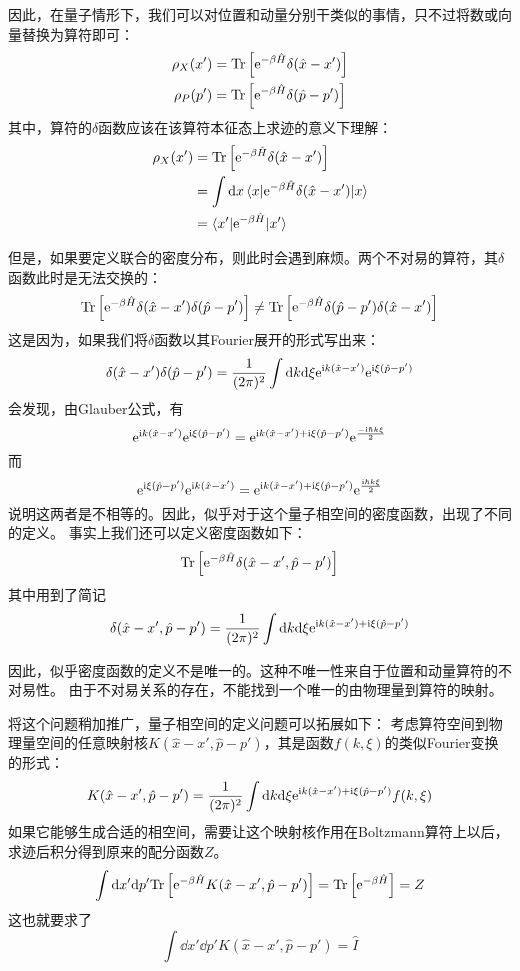         因此，在量子情形下，我们可以对位置和动量分别干类似的事情，只不过将数或向量替换为算符即可：
        \[
            \begin{gathered}
                \rho_X(x') = \textrm{Tr}\left[\mathrm{e}^{-\beta\hat{H}}\delta(\hat{x} - x')\right]
                \\
                \rho_P(p') = \textrm{Tr}\left[\mathrm{e}^{-\beta\hat{H}}\delta(\hat{p} - p')\right]
            \end{gathered}
        \]
        其中，算符的\(\delta\)函数应该在该算符本征态上求迹的意义下理解：
        \[
            \begin{aligned}
                \rho_X(x') &= \textrm{Tr}\left[\mathrm{e}^{-\beta\hat{H}}\delta(\hat{x} - x')\right] 
            \\ &= \int \mathrm{d} x \braket{x | \mathrm{e}^{-\beta\hat{H}}\delta(\hat{x} - x') | x}
            \\ &= \braket{x' | \mathrm{e}^{-\beta\hat{H}} | x'}
            \end{aligned}
        \]

        但是，如果要定义联合的密度分布，则此时会遇到麻烦。两个不对易的算符，其\(\delta\)函数此时是无法交换的：
        \[
            \textrm{Tr}\left[\mathrm{e}^{-\beta\hat{H}}\delta(\hat{x} - x')\delta(\hat{p} - p')\right] \neq \textrm{Tr}\left[\mathrm{e}^{-\beta\hat{H}}\delta(\hat{p} - p')\delta(\hat{x} - x')\right]
        \]
        这是因为，如果我们将\(\delta\)函数以其Fourier展开的形式写出来：
        \[
            \delta(\hat{x} - x')\delta(\hat{p} - p') = \frac{1}{(2\pi)^2} \int \mathrm{d} k \mathrm{d} \xi \mathrm{e}^{\mathrm{i} k(\hat{x} - x')}\mathrm{e}^{\mathrm{i} \xi (\hat{p} - p')}
        \]
        会发现，由Glauber公式，有
        \[
            \mathrm{e}^{\mathrm{i} k(\hat{x} - x')}\mathrm{e}^{\mathrm{i} \xi (\hat{p} - p')} = \mathrm{e}^{\mathrm{i} k(\hat{x} - x') + \mathrm{i} \xi (\hat{p} - p')} \mathrm{e}^{\frac{-\mathrm{i}\hbar k\xi}{2}}
        \]
        而
        \[
            \mathrm{e}^{\mathrm{i} \xi (\hat{p} - p')}\mathrm{e}^{\mathrm{i} k(\hat{x} - x')} = \mathrm{e}^{\mathrm{i} k(\hat{x} - x') + \mathrm{i} \xi (\hat{p} - p')} \mathrm{e}^{\frac{\mathrm{i}\hbar k\xi}{2}}
        \]
        说明这两者是不相等的。因此，似乎对于这个量子相空间的密度函数，出现了不同的定义。
        事实上我们还可以定义密度函数如下：
        \[
            \textrm{Tr}\left[\mathrm{e}^{-\beta\hat{H}}\delta(\hat{x} - x', \hat{p} - p')\right]
        \]
        其中用到了简记
        \[
            \delta(\hat{x} - x', \hat{p} - p') = \frac{1}{(2\pi)^2} \int \mathrm{d} k \mathrm{d} \xi
            \mathrm{e}^{\mathrm{i} k(\hat{x} - x') + \mathrm{i} \xi (\hat{p} - p')}
        \]

        因此，似乎密度函数的定义不是唯一的。这种不唯一性来自于位置和动量算符的不对易性。
        由于不对易关系的存在，不能找到一个唯一的由物理量到算符的映射。

        将这个问题稍加推广，量子相空间的定义问题可以拓展如下：
        考虑算符空间到物理量空间的任意映射核\(K(\hat{x} - x', \hat{p} - p')\)，其是函数\(f(k, \xi)\)的类似Fourier变换的形式：
        \[
            K(\hat{x} - x', \hat{p} - p') = \frac{1}{(2\pi)^2} \int \mathrm{d} k \mathrm{d} \xi \mathrm{e}^{\mathrm{i} k(\hat{x} - x') + \mathrm{i} \xi (\hat{p} - p')} f(k, \xi)
        \]
        如果它能够生成合适的相空间，需要让这个映射核作用在Boltzmann算符上以后，求迹后积分得到原来的配分函数\(Z\)。
        \[
            \int \mathrm{d} x' \mathrm{d} p' \textrm{Tr}\left[\mathrm{e}^{-\beta\hat{H}}K(\hat{x} - x', \hat{p} - p')\right] = \textrm{Tr}\left[\mathrm{e}^{-\beta\hat{H}}\right] = Z
        \]
        这也就要求了
        \[
            \int \dd x' \dd p' K(\hat{x} - x', \hat{p} - p') = \hat{I}
        \]
        
